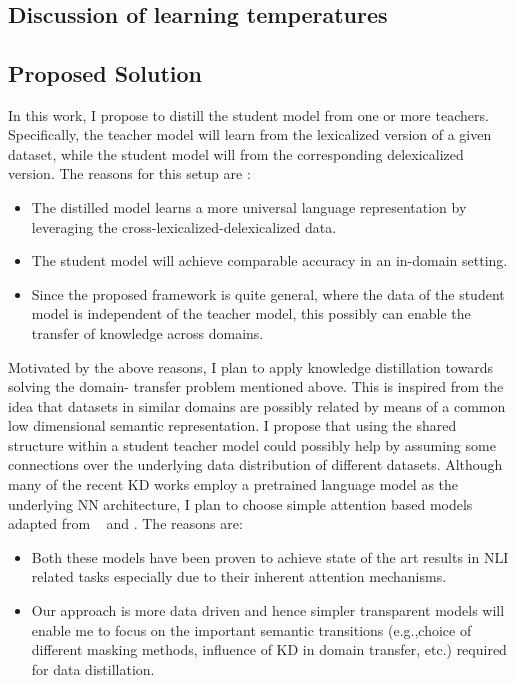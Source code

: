 \documentclass[compsoc,onecolumn]{IEEEtran}
\begin{document}
\
\subsection{Discussion of learning temperatures}

\subsection{Proposed Solution}

In this work, I propose to distill the student model from one or more teachers. Specifically, the teacher model will learn from the lexicalized version of a given dataset, while the student model will from the corresponding delexicalized version. 
The reasons for this setup are :

\begin{itemize}
  \item The distilled model learns a more universal language representation by leveraging the cross-lexicalized-delexicalized data.
  \item The student model will achieve comparable accuracy in an in-domain setting.
  \item Since the proposed framework is quite general, where the data of the student model is independent of the teacher model, this possibly can enable the transfer of knowledge across domains.
\end{itemize}

Motivated by the above reasons, I plan to apply knowledge distillation towards solving the domain- transfer problem mentioned above. This is inspired from the idea that datasets in similar domains are possibly related by means of a common low dimensional semantic representation. I propose that using the shared structure within a student teacher model could possibly help by assuming some connections over the underlying data distribution of different datasets. Although many of the recent KD works \citep*{jiao2019tinybert,tang2019distilling,zhao2019extreme}  employ a  pretrained language model as the underlying NN architecture, I plan to choose simple attention based models adapted from ~\citep*{parikh2016decomposable} and \citep*{chen2016enhanced} . The reasons are:

\begin{itemize}
  \item Both these models have been proven to achieve state of the art results in NLI related tasks especially due to their inherent attention mechanisms.
  \item Our approach is more data driven and hence simpler transparent models will enable me to focus on the important semantic transitions (e.g.,choice of different masking methods, influence of KD in domain transfer, etc.) required for data distillation.
 \end{itemize}
\end{document}
